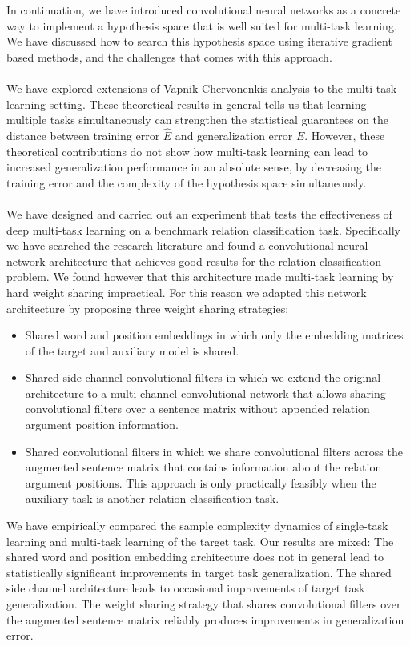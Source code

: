In continuation, we have introduced convolutional neural networks as a concrete way to implement a hypothesis space that is well suited for multi-task learning. We have discussed how to search this hypothesis space using iterative gradient based methods, and the challenges that comes with this approach.
\\\\
We have explored extensions of Vapnik-Chervonenkis analysis to the multi-task learning setting. These theoretical results in general tells us that learning multiple tasks simultaneously can strengthen the statistical guarantees on the distance between training error $\hat{E}$ and generalization error $E$. However, these theoretical contributions do not show how multi-task learning can lead to increased generalization performance in an absolute sense, by decreasing the training error and the complexity of the hypothesis space simultaneously.
\\\\
We have designed and carried out an experiment that tests the effectiveness of deep multi-task learning on a benchmark relation classification task. Specifically we have searched the research literature and found a convolutional neural network architecture that achieves good results for the relation classification problem. We found however that this architecture made multi-task learning by hard weight sharing impractical. For this reason we adapted this network architecture by proposing three weight sharing strategies:
\begin{itemize}
	\item Shared word and position embeddings in which only the embedding matrices of the target and auxiliary model is shared.
	\item Shared side channel convolutional filters in which we extend the original architecture to a multi-channel convolutional network that allows sharing convolutional filters over a sentence matrix without appended relation argument position information.
	\item Shared convolutional filters in which we share convolutional filters across the augmented sentence matrix that contains information about the relation argument positions. This approach is only practically feasibly when the auxiliary task is another relation classification task.
\end{itemize}
We have empirically compared the sample complexity dynamics of single-task learning and multi-task learning of the target task. Our results are mixed: The shared word and position embedding architecture does not in general lead to statistically significant improvements in target task generalization. The shared side channel architecture leads to occasional improvements of target task generalization. The weight sharing strategy that shares convolutional filters over the augmented sentence matrix reliably produces improvements in generalization error.
